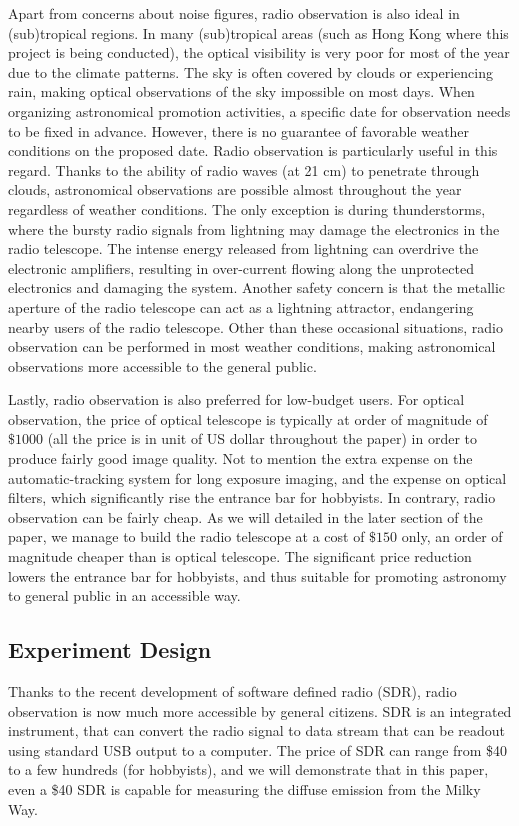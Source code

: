 \documentclass[12pt]{article}
\begin{document}
    Apart from concerns about noise figures, radio observation is also ideal in (sub)tropical regions.
    In many (sub)tropical areas (such as Hong Kong where this project is being conducted), the optical visibility is very poor for most of the year due to the climate patterns. The sky is often covered by clouds or experiencing rain, making optical observations of the sky impossible on most days. 
    When organizing astronomical promotion activities, a specific date for observation needs to be fixed in advance. However, there is no guarantee of favorable weather conditions on the proposed date.
    Radio observation is particularly useful in this regard. 
    Thanks to the ability of radio waves (at 21 cm) to penetrate through clouds, astronomical observations are possible almost throughout the year regardless of weather conditions. 
    The only exception is during thunderstorms, where the bursty radio signals from lightning may damage the electronics in the radio telescope. 
    The intense energy released from lightning can overdrive the electronic amplifiers, resulting in over-current flowing along the unprotected electronics and damaging the system.
    Another safety concern is that the metallic aperture of the radio telescope can act as a lightning attractor, endangering nearby users of the radio telescope.
    Other than these occasional situations, radio observation can be performed in most weather conditions, making astronomical observations more accessible to the general public.

    Lastly, radio observation is also preferred for low-budget users. 
    For optical observation, the price of optical telescope is typically at order of magnitude of $\$1000$ (all the price is in unit of US dollar throughout the paper) in order to produce fairly good image quality. Not to mention the extra expense on the automatic-tracking system for long exposure imaging, and the expense on optical filters, which significantly rise the entrance bar for hobbyists.
    In contrary, radio observation can be fairly cheap.
    As we will detailed in the later section of the paper, we manage to build the radio telescope at a cost of $\$150$ only, an order of magnitude cheaper than is optical telescope. 
    The significant price reduction lowers the entrance bar for hobbyists, and thus suitable for promoting astronomy to general public in an accessible way.
    
    \subsection{Experiment Design}
    Thanks to the recent development of software defined radio (SDR), radio observation is now much more accessible by general citizens. 
    SDR is an integrated instrument, that can convert the radio signal to data stream that can be readout using standard USB output to a computer.
    The price of SDR can range from \$40 to a few hundreds (for hobbyists), and we will demonstrate that in this paper, even a \$40 SDR is capable for measuring the diffuse emission from the Milky Way.
\end{document}
